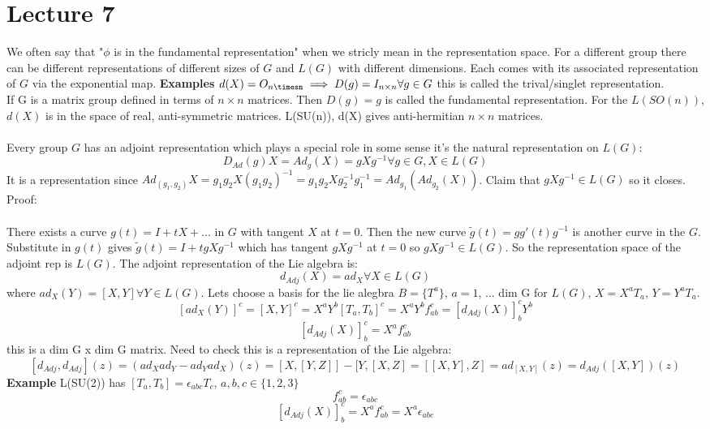 \documentclass{article}
\begin{document}
{\section{Lecture 7}
We often say that "$\phi$ is in the fundamental representation" when we stricly mean in the representation space. For a different group there can be different representations of different sizes of $G$ and $L(G)$ with different dimensions. Each comes with its associated representation of $G$ via the exponential map. 
\textbf{Examples}
$d(X) = O_{n\timesn} \implies D(g) = I_{n\times n} \forall g \in G$ this is called the trival/singlet representation.\\
If G is a matrix group defined in terms of $n\times n$ matrices. Then $D(g) = g$ is called the fundamental representation. For the $L(SO(n))$, $d(X)$ is in the space of real, anti-symmetric matrices. L(SU(n)), d(X) gives anti-hermitian $n\times n$ matrices.\\\\
Every group $G$ has an adjoint representation which plays a special role in some sense it's the natural representation on $L(G)$:
$$
D_{Ad}(g)X = Ad_g(X) = gXg^{-1} \forall g \in G, X \in L(G)
$$
It is a representation since $Ad_{(g_1,g_2)}X = g_1g_2X(g_1g_2)^{-1} = g_1g_2Xg_2^{-1}g_1^{-1} = Ad_{g_1}(Ad_{g_2}(X))$. Claim that $gXg^{-1} \in L(G)$ so it closes. Proof:\\\\
There exists a curve $g(t) = I + tX + ...$ in $G$ with tangent $X$ at $t=0$. Then the new curve $\tilde g(t) = g g'(t) g^{-1}$ is another curve in the $G$. Substitute in $g(t)$ gives $\tilde g(t) = I + tgXg^{-1}$ which has tangent $gXg^{-1}$ at $t=0$ so $gXg^{-1} \in L(G)$. So the representation space of the adjoint rep is $L(G)$. The adjoint representation of the Lie algebra is: 
$$
d_{Adj}(X) = ad_X \forall X \in L(G)
$$
where $ad_X(Y) = [X,Y] \forall Y \in L(G)$. Lets choose a basis for the lie alegbra $B= \{T^a\}$, $a=1$, ... dim G for $L(G)$, $X= X^aT_a$, $Y= Y^aT_a$.\\
$$
[ad_X(Y)]^c = [X,Y]^c = X^aY^b[T_a,T_b]^c = X^aY^b f^c_{ab} = [d_{Adj}(X)]^c_b Y^b
$$
$$
[d_{Adj} (X)]^c_b = X^a f^c_{ab}
$$
this is a dim G x dim G matrix. Need to check this is a representation of the Lie algebra: 
$$
[d_{Adj}, d_{Adj}](z)=(ad_Xad_Y - ad_Y ad_X)(z) = [X,[Y,Z]] - [Y,[X,Z] = [[X,Y],Z] = ad_{[X,Y]}(z) = d_{Adj}([X,Y])(z)
$$
\textbf{Example}
L(SU(2)) has $[T_a, T_b] = \epsilon_{abc}T_c$, $a,b,c \in \{1,2,3\}$
$$
f^c_{ab} = \epsilon_{abc}
$$
$$
[d_{Adj}(X)]^c_b = X^af^c_{ab} = X^a \epsilon_{abc}
$$}
\end{document}
